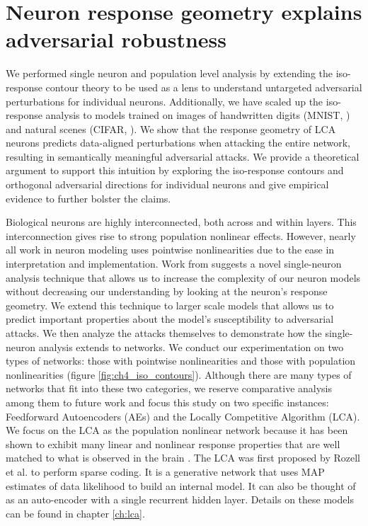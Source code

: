 \section{Neuron response geometry explains adversarial robustness}\label{sec:ch4_neuron}
We performed single neuron and population level analysis by extending the iso-response contour theory to be used as a lens to understand untargeted adversarial perturbations for individual neurons. Additionally, we have scaled up the iso-response analysis to models trained on images of handwritten digits (MNIST, \cite{lecun1998mnist}) and natural scenes (CIFAR, \cite{krizhevsky2009learning}). We show that the response geometry of LCA neurons predicts data-aligned perturbations when attacking the entire network, resulting in semantically meaningful adversarial attacks. We provide a theoretical argument to support this intuition by exploring the iso-response contours and orthogonal adversarial directions for individual neurons and give empirical evidence to further bolster the claims. 

Biological neurons are highly interconnected, both across and within layers. This interconnection gives rise to strong population nonlinear effects. However, nearly all work in neuron modeling uses pointwise nonlinearities due to the ease in interpretation and implementation. Work from \citeyearpar{golden2016conjectures} suggests a novel single-neuron analysis technique that allows us to increase the complexity of our neuron models without decreasing our understanding by looking at the neuron’s response geometry. We extend this technique to larger scale models that allows us to predict important properties about the model’s susceptibility to adversarial attacks. We then analyze the attacks themselves to demonstrate how the single-neuron analysis extends to networks. We conduct our experimentation on two types of networks: those with pointwise nonlinearities and those with population nonlinearities (figure \ref{fig:ch4_iso_contours}). Although there are many types of networks that fit into these two categories, we reserve comparative analysis among them to future work and focus this study on two specific instances: Feedforward Autoencoders (AEs) and the Locally Competitive Algorithm (LCA). We focus on the LCA as the population nonlinear network because it has been shown to exhibit many linear and nonlinear response properties that are well matched to what is observed in the brain \parencite{zhu2013visual, olshausen1997sparse}. The LCA was first proposed by Rozell et al. \citeyearpar{rozell2008sparse} to perform sparse coding. It is a generative network that uses MAP estimates of data likelihood to build an internal model. It can also be thought of as an auto-encoder with a single recurrent hidden layer. Details on these models can be found in chapter \ref{ch:lca}.

